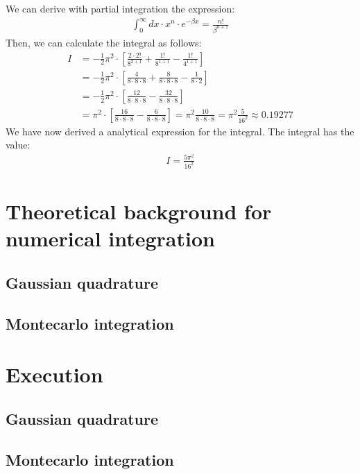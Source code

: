 \documentclass[10pt,a4paper]{article}
\begin{document}
We can derive with partial integration the expression:
\begin{align}
\int_{0}^{\infty} dx \cdot x^n \cdot e^{- \beta x } = \frac{n!}{\beta^{n+1}}
\end{align}
Then, we can calculate the integral as follows:
\begin{align}
I&= -\frac{1}{2} \pi^2 \cdot \left[ \frac{2 \cdot 2!}{8^{2+1}}+ \frac{1!}{8^{1+1}} - \frac{1!}{4^{1+1}} \right]\\
&= -\frac{1}{2} \pi^2 \cdot \left[ \frac{4}{8 \cdot8 \cdot 8}+ \frac{8}{8 \cdot 8 \cdot 8} - \frac{1}{8 \cdot 2} \right]\\
&= -\frac{1}{2} \pi^2 \cdot \left[ \frac{12}{8 \cdot8 \cdot 8} - \frac{32}{8 \cdot 8 \cdot 8} \right]\\
&= \pi^2 \cdot \left[ \frac{16}{8 \cdot 8 \cdot 8}- \frac{6}{8 \cdot 8 \cdot 8} \right]= \pi^2 \frac{10}{8 \cdot 8 \cdot 8}= \pi^2 \frac{5}{16^2}\approx 0.19277
\end{align}
We have now derived a analytical expression for the integral. The integral has the value:
\begin{align}
I = \frac{5 \pi^2}{16^2}
\end{align}
\section{Theoretical background for numerical integration}

\subsection{Gaussian quadrature}

\subsection{Montecarlo integration}

\section{Execution}

\subsection{Gaussian quadrature}

\subsection{Montecarlo integration}
\end{document}

